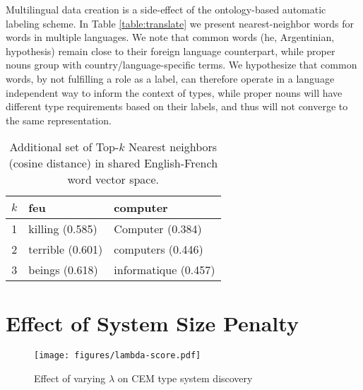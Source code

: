 \documentclass[letterpaper]{article}
\begin{document}
Multilingual data creation is a side-effect of the ontology-based automatic labeling scheme. In Table \ref{table:translate} we present nearest-neighbor words for words in multiple languages. We note that common words (he, Argentinian, hypothesis) remain close to their foreign language counterpart, while proper nouns group with country/language-specific terms.
We hypothesize that common words, by not fulfilling a role as a label, can therefore operate in a language independent way to inform the context of types, while proper nouns will have different type requirements based on their labels, and thus will not converge to the same representation.

\begin{table*}[ht]
\caption{Additional set of Top-$k$ Nearest neighbors (cosine distance) in shared English-French word vector space.}
\begin{center}
\begin{tabular}{|r|l|l|}
\hline
$k$ & feu             & computer\\
\hline
1    & killing (0.585) & Computer (0.384)\\
2    & terrible (0.601) & computers (0.446) \\
3    & beings (0.618) & informatique (0.457) \\
\hline
\end{tabular}
\end{center}
\label{table:translate-more}
\end{table*}

\section{Effect of System Size Penalty}
\label{section:lambdaexp}

\begin{figure}[ht]
\centering
\texttt{[image: figures/lambda-score.pdf]}
\caption{Effect of varying $\lambda$ on CEM type system discovery}
\label{fig:lambda}
\end{figure}
\end{document}
